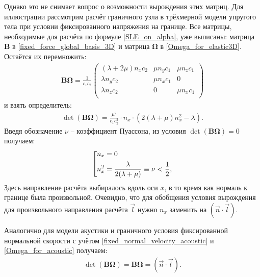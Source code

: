 Однако это не снимает вопрос о возможности вырождения этих матриц. 
Для иллюстрации рассмотрим расчёт граничного узла в трёхмерной 
модели упругого тела при условии фиксированного напряжения на границе. 
Все матрицы, необходимые для расчёта по формуле \ref{SLE_on_alpha}, уже выписаны: 
матрица $\mathbf{B}$ в \ref{fixed_force_global_basis_3D} и 
матрица $\mathbf{\Omega}$ в \ref{Omega_for_elastic3D}. 
Остаётся их перемножить:
\begin{align}
	\mathbf{B} \mathbf{\Omega} = \frac{1}{c_1 c_2}
	\left( \begin{array}{cccccccccccc}
	 (\lambda + 2\mu) n_x c_2 & \mu n_y c_1 & \mu n_z c_1   \\
	 \lambda n_y c_2          & \mu n_x c_1 & 0             \\
	 \lambda n_z c_2          & 0 & \mu n_x c_1             \\
	\end{array} \right)
\end{align}
и взять определитель:
\begin{eqnarray}
	\det (\mathbf{B} \mathbf{\Omega}) = \frac{\mu^{2}}{c_1 c^2_2} \cdot n_x \cdot (2 (\lambda + \mu) n^2_x - \lambda).
\end{eqnarray}
Введя обозначение $\nu$ -- коэффициент Пуассона, из условия 
$\det (\mathbf{B} \mathbf{\Omega}) = 0$ получаем:
\begin{eqnarray}
\left[
\begin{gathered} 
	 n_x = 0  \hfill  \\
	 n^2_x = \frac{\lambda}{2(\lambda + \mu)} \equiv \nu < \frac{1}{2}, \hfill  \\
\end{gathered} 
\right.
\end{eqnarray}
Здесь направление расчёта выбиралось вдоль оси $x$, в то время как нормаль 
к границе была произвольной. Очевидно, что для обобщения условия 
вырождения для произвольного направления расчёта $\vec{l}$ нужно $n_x$ заменить на 
$(\vec{n} \cdot \vec{l})$.

Аналогично для модели акустики и граничного условия фиксированной 
нормальной скорости с учётом \ref{fixed_normal_velocity_acoustic} 
и \ref{Omega_for_acoustic} получаем:
\begin{eqnarray}
\label{BOmega_acoustic}
	\det (\mathbf{B} \mathbf{\Omega}) = \mathbf{B} \mathbf{\Omega} = (\vec{n} \cdot \vec{l}).
\end{eqnarray}

